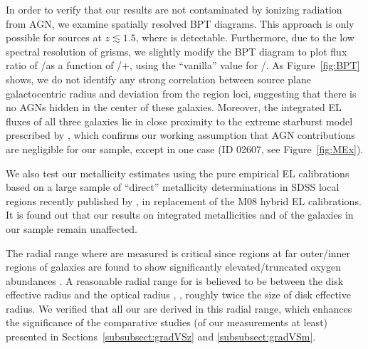In order to verify that our results are not contaminated by ionizing radiation from AGN, we
examine spatially resolved BPT diagrams. This approach is only possible for sources at
$z\lesssim1.5$, where \Ha is detectable. Furthermore, due to the low spectral resolution of
\hst grisms, we slightly modify the BPT diagram to plot flux ratio of \OIII/\Hb as a function
of \SII/\Ha+\NII, using the ``vanilla'' value for \NII/\Ha. As Figure~\ref{fig:BPT} shows, we
do not identify any strong correlation between source plane galactocentric radius and
deviation from the \HII region loci, suggesting that there is no AGNs hidden in the center of
these galaxies.
Moreover, the integrated EL fluxes of all three galaxies lie in close proximity to the
extreme starburst model prescribed by \citet{Kewley:2006ib}, which confirms our working assumption that AGN contributions are
negligible for our sample, except in one case (\ie ID 02607, see Figure~\ref{fig:MEx}).

We also test our metallicity estimates using the pure empirical EL calibrations based on a large sample of ``direct'' metallicity 
determinations in SDSS local \HII regions recently published by \citet{Curti:2016fn}, in replacement of the M08 hybrid EL 
calibrations. It is found out that our results on integrated metallicities and \mgs of the galaxies in our sample remain 
unaffected.

The radial range where \mgs are measured is critical since \HII regions at far outer/inner regions of galaxies are found to show 
significantly elevated/truncated oxygen abundances \citep[see \eg][]{2014A&A...563A..49S}.
A reasonable radial range for \mgms is believed to be between the disk effective radius \citep{Freeman:1970eb,2014A&A...563A..49S} 
and the optical radius \citep{Molla:2005eq,Molla:2016be}, \ie, roughly twice the size of disk effective radius.  We verified that 
all our \mgs are derived in this radial range, which enhances the significance of the comparative studies (of our measurements at 
least) presented in Sections~\ref{subsubsect:gradVSz} and \ref{subsubsect:gradVSm}.

